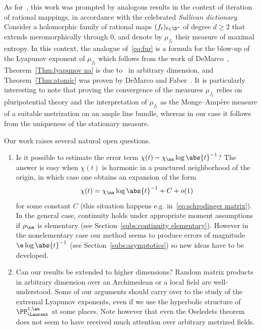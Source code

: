 As for~\cite{kleinbif, bers1}, this work was prompted by analogous results in the context of iteration of rational mappings, in accordance with the celebrated \emph{Sullivan dictionary}. Consider a holomorphic family of rational maps $(f_t)_{t\in \D^*}$ of degree $d\ge2$ that extends meromorphically through $0$, and denote by $\mu_{f_t}$ their measure of maximal entropy. In this context, the analogue of~\eqref{eq:fur} is a formula for the blow-up of the Lyapunov exponent of $\mu_{f_t}$ which follows from the work of DeMarco~\cite{demarco03,demarco16}, Theorem~\ref{Thm:lyapunov na} is due to~\cite{degeneration} in arbitrary dimension, and Theorem~\ref{Thm:atomic} was proven by DeMarco and Faber~\cite{demarco-faber}. It is particularly interesting to note that proving the convergence of the measures $\mu_{f_t}$ relies on pluripotential theory and the interpretation of $\mu_{f_t}$ as the Monge--Amp\`ere measure of a suitable metrization on an ample line bundle, whereas in our case it follows from the uniqueness of the stationary measure.


Our work raises several natural open questions.
\begin{enumerate}
\item Is it possible to estimate the error term $\chi(t) - \chi_\na \log\abs{t}^{-1}$? The answer is easy when $\chi(t)$ is harmonic in a punctured neighborhood of the origin, in which case one obtains an expansion of the form
\[
\chi(t) = \chi_\na \log\abs{t}^{-1} + C +o(1)
\]
for some constant $C$ (this situation happens e.g. in~\eqref{eq:schrodinger matrix}).
In the general case, continuity holds under appropriate moment assumptions if $\rho_\na$ is elementary (see Section~\ref{subs:continuity elementary}). However in the nonelementary case our method seems to produce errors of magnitude $\e\log\abs{t}^{-1}$ (see Section~\ref{subs:asymptotics}) so new ideas have to be developed.

\item Can our results be extended to higher dimensions? Random matrix products in arbitrary dimension over an Archimedean or a local field are well-understood. Some of our arguments should carry over to the study of the extremal Lyapunov exponents, even if we use the hyperbolic structure of $\PP^{1, \an}_{\Laurent}$ at some places. Note however that even the Oseledets theorem does not seem to have received much attention over arbitrary metrized fields.
\end{enumerate}

